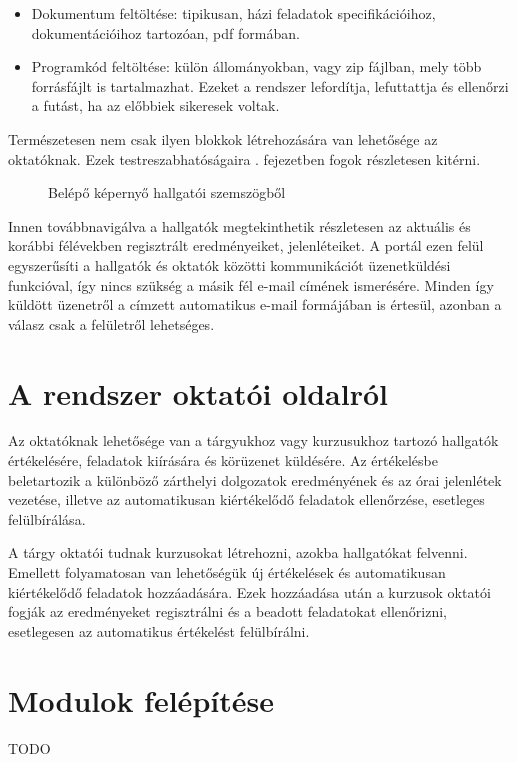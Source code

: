     \begin{itemize}
        \item Dokumentum feltöltése: tipikusan, házi feladatok specifikációihoz, dokumentációihoz tartozóan, pdf formában.
        \item Programkód feltöltése: külön állományokban, vagy zip fájlban, mely több forrásfájlt is tartalmazhat. Ezeket a rendszer lefordítja, lefuttattja és ellenőrzi a futást, ha az előbbiek sikeresek voltak.
    \end{itemize}

    Természetesen nem csak ilyen blokkok létrehozására van lehetősége az oktatóknak. Ezek testreszabhatóságaira . fejezetben fogok részletesen kitérni.
    
    \begin{figure}[h]
        \centering
        \caption{Belépő képernyő hallgatói szemszögből}
        \label{fig:jporta_home}
    \end{figure}

    Innen továbbnavigálva a hallgatók megtekinthetik részletesen az aktuális és korábbi félévekben regisztrált eredményeiket, jelenléteiket. A portál ezen felül egyszerűsíti a hallgatók és oktatók közötti kommunikációt üzenetküldési funkcióval, így nincs szükség a másik fél e-mail címének ismerésére. Minden így küldött üzenetről a címzett automatikus e-mail formájában is értesül, azonban a válasz csak a felületről lehetséges.
 
\section{A rendszer oktatói oldalról}\label{section:teacher}
    Az oktatóknak lehetősége van a tárgyukhoz vagy kurzusukhoz tartozó hallgatók értékelésére, feladatok kiírására és körüzenet küldésére. Az értékelésbe beletartozik a különböző zárthelyi dolgozatok eredményének és az órai jelenlétek vezetése, illetve az automatikusan kiértékelődő feladatok ellenőrzése, esetleges felülbírálása.

    A tárgy oktatói tudnak kurzusokat létrehozni, azokba hallgatókat felvenni. Emellett folyamatosan van lehetőségük új értékelések és automatikusan kiértékelődő feladatok hozzáadására. Ezek hozzáadása után a kurzusok oktatói fogják az eredményeket regisztrálni és a beadott feladatokat ellenőrizni, esetlegesen az automatikus értékelést felülbírálni.

\section{Modulok felépítése}
TODO